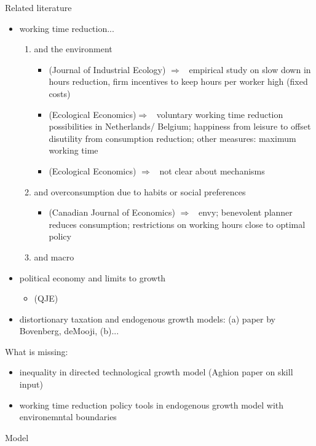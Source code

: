 \documentclass[11pt,aspectratio=169]{beamer}
\newcommand{\ar}{$\Rightarrow$ \ }
\begin{document}
\begin{frame}[allowframebreaks]{Related literature}
\begin{itemize}
\begin{enumerate}
\begin{itemize}
\end{itemize}
\end{enumerate}
\item working time reduction...
\begin{enumerate}
\item and the environment
\begin{itemize}
\item \cite{Schor2005SustainableReduction}(Journal of Industrial Ecology) \ar empirical study on slow down in hours reduction, firm incentives to keep hours per worker high (fixed costs)
\item \cite{Pullinger2014WorkingDesign}(Ecological Economics)\ar voluntary working time reduction possibilities in Netherlands/ Belgium; happiness from leisure to  offset disutility from consumption reduction; other measures: maximum working time
\item \cite{Cieplinski2021EnvironmentalReductionb}(Ecological Economics) \ar not clear about mechanisms
\end{itemize}
\item and overconsumption due to habits or social preferences
\begin{itemize}
\item \cite{Alvarez-Cuadrado2007EnvyHours}(Canadian Journal of Economics) \ar envy; benevolent planner reduces consumption; restrictions on working hours close to optimal policy 
\end{itemize}
\item and macro
\end{enumerate}
\item political economy and limits to growth
\begin{itemize}
\item \cite{Alesina1994DistributiveGrowth}(QJE)
\end{itemize}
\item distortionary taxation and endogenous growth models: (a) paper by Bovenberg, deMooji, (b)...
\end{itemize}
What is missing: 
\begin{itemize}
\item inequality in directed technological growth model (Aghion paper on skill input)
\item working time reduction policy tools in endogenous growth model with environemntal boundaries
\end{itemize}
\end{frame}

\begin{frame}{Model}

\end{frame}
\end{document}
